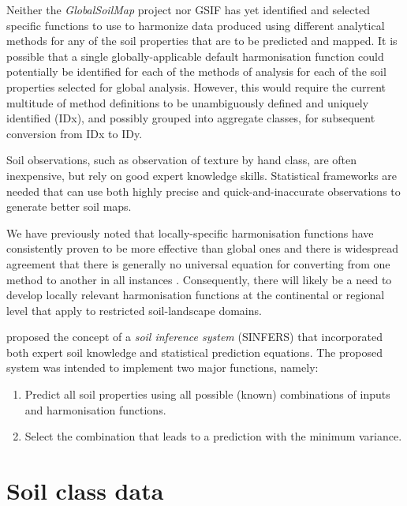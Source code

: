 \documentclass[graybox,natbib,nospthms,UStrade]{svmono}
\let\BeginKnitrBlock\begin \let\EndKnitrBlock\end
\let\BeginKnitrBlock\begin \let\EndKnitrBlock\end
\begin{document}
Neither the \emph{GlobalSoilMap} project nor GSIF has yet identified and
selected specific functions to use to harmonize data produced using
different analytical methods for any of the soil properties that are to
be predicted and mapped. It is possible that a single
globally-applicable default harmonisation function could potentially be
identified for each of the methods of analysis for each of the soil
properties selected for global analysis. However, this would require the
current multitude of method definitions to be unambiguously defined and
uniquely identified (IDx), and possibly grouped into aggregate classes,
for subsequent conversion from IDx to IDy.

\BeginKnitrBlock{rmdnote}
Soil observations, such as observation of texture by hand class, are
often inexpensive, but rely on good expert knowledge skills. Statistical frameworks are needed that can use both highly precise and quick-and-inaccurate observations to generate better soil maps.
\EndKnitrBlock{rmdnote}

We have previously noted that locally-specific harmonisation functions
have consistently proven to be more effective than global ones and there
is widespread agreement that there is generally no universal equation
for converting from one method to another in all instances
\citep{Konen2002SSSAJ, Meersmans2009SUM, Jankauskas2006CSSPA, Jolivet1998CSSPA, DeVos2007SUM}.
Consequently, there will likely be a need to develop locally relevant
harmonisation functions at the continental or regional level that apply
to restricted soil-landscape domains.

\citet{McBratney2002Geoderma} proposed the concept of a \emph{soil inference system}
(SINFERS) that incorporated both expert soil knowledge and statistical
prediction equations. The proposed system was intended to implement two
major functions, namely:

\begin{enumerate}
\def\labelenumi{\arabic{enumi}.}
\item
  Predict all soil properties using all possible (known) combinations
  of inputs and harmonisation functions.
\item
  Select the combination that leads to a prediction with the
  minimum variance.
\end{enumerate}

\hypertarget{soil-class-data}{%
\section{Soil class data}\label{soil-class-data}}
\end{document}
